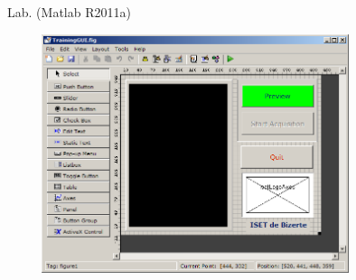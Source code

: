\documentclass[10pt, english, notes]{beamer}
\begin{document}
\begin{frame}{Lab. \footnotesize{(Matlab R2011a)}}
\begin{center}
\includegraphics[height = 7cm, width = 11cm]{GUI/GUIGuide}
\end{center}
\end{frame}
\end{document}
